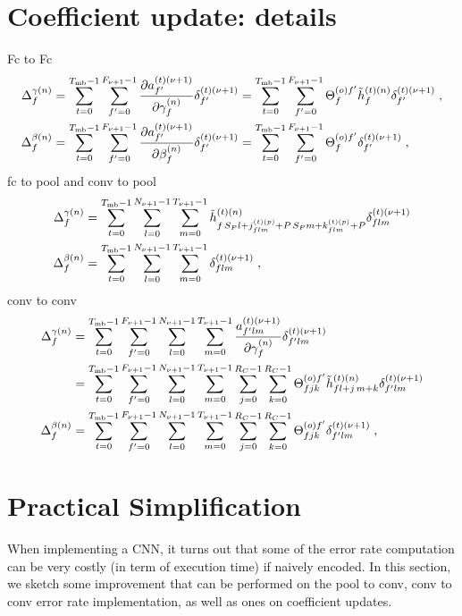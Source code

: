 \begin{subappendices}
\section{Coefficient update: details}
Fc to Fc
\begin{align}
\Delta_f^{\gamma(n)}&=\sum_{t=0}^{T_{{\rm mb}}-1}\sum_{f'=0}^{F_{\nu+1}-1}
%
\frac{\partial a^{(t)(\nu+1)}_{f'}}{\partial\gamma_f^{(n)}}\delta^{(t)(\nu+1)}_{f'}
%
=\sum_{t=0}^{T_{{\rm mb}}-1}\sum_{f'=0}^{F_{\nu+1}-1}
%
\Theta^{(o)f'}_{f}\tilde{h}^{(t)(n)}_{f}\delta^{(t)({\nu+1})}_{f'}\;,\\
%
\Delta_f^{\beta(n)}&=\sum_{t=0}^{T_{{\rm mb}}-1}\sum_{f'=0}^{F_{\nu+1}-1}
%
\frac{\partial a^{(t)(\nu+1)}_{f'}}{\partial\beta_f^{(n)}}\delta^{(t)(\nu+1)}_{f'}
%
=\sum_{t=0}^{T_{{\rm mb}}-1}\sum_{f'=0}^{F_{\nu+1}-1}\Theta^{(o)f'}_{f}\delta^{(t)(\nu+1)}_{f'}\;,
\end{align}
fc to pool and conv to pool
\begin{align}
\Delta_f^{\gamma(n)}&=
%
\sum_{t=0}^{T_{{\rm mb}}-1}\sum_{l=0}^{N_{\nu+1}-1}\sum_{m=0}^{T_{\nu+1}-1}
%
\tilde{h}_{f\,S_P l+j_{flm}^{(t)(p)}+P\,S_Pm+k_{flm}^{(t)(p)}+P}^{(t)(n)}\delta^{(t)(\nu+1)}_{flm}\\
%
\Delta_f^{\beta(n)}&=
%
\sum_{t=0}^{T_{{\rm mb}}-1}\sum_{l=0}^{N_{\nu+1}-1}\sum_{m=0}^{T_{\nu+1}-1}\delta^{(t)(\nu+1)}_{flm}\;,
\end{align}
conv to conv
\begin{align}
\Delta_f^{\gamma(n)}&=
%
\sum_{t=0}^{T_{{\rm mb}}-1}\sum_{f'=0}^{F_{\nu+1}-1}\sum_{l=0}^{N_{\nu+1}-1}\sum_{m=0}^{T_{\nu+1}-1}
%
\frac{a^{(t)(\nu+1)}_{f'lm}}{\partial \gamma_f^{(n)}}\delta^{(t)(\nu+1)}_{f'lm}\\
%
&=\sum_{t=0}^{T_{{\rm mb}}-1}\sum_{f'=0}^{F_{\nu+1}-1}\sum_{l=0}^{N_{\nu+1}-1}\sum_{m=0}^{T_{\nu+1}-1}
%
\sum_{j=0}^{R_C-1}\sum_{k=0}^{R_C-1}\Theta^{(o)f'}_{fjk}
%
\tilde{h}^{(t)(n)}_{fl+j\,m+k}\delta^{(t)(\nu+1)}_{f'lm}\\
%
\Delta_f^{\beta(n)}&=
%
\sum_{t=0}^{T_{{\rm mb}}-1}\sum_{f'=0}^{F_{\nu+1}-1}\sum_{l=0}^{N_{\nu+1}-1}\sum_{m=0}^{T_{\nu+1}-1}
%
\sum_{j=0}^{R_C-1}\sum_{k=0}^{R_C-1}\Theta^{(o)f'}_{fjk}\delta^{(t)(\nu+1)}_{f'lm}\;,
\end{align}

\section{Practical Simplification} \label{sec:pracsimpl}

When implementing a CNN, it turns out that some of the error rate computation can be very costly (in term of execution time) if naively encoded. In this section, we sketch some improvement that can be performed on the pool to conv, conv to conv  error rate implementation, as well as ones on coefficient updates.


\end{subappendices}

